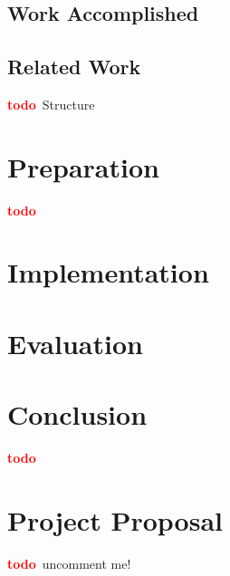\documentclass[12pt,a4paper,twoside,openright]{report}
\newcommand{\todo}{\textcolor{red}{\textbf{todo}~}}
\begin{document}
\section{Work Accomplished}




\section{Related Work}

\todo Structure

\chapter{Preparation}

\todo

\chapter{Implementation}


\chapter{Evaluation}


\chapter{Conclusion}

\todo

\appendix

\chapter{Project Proposal}

\todo uncomment me!
%
\end{document}
